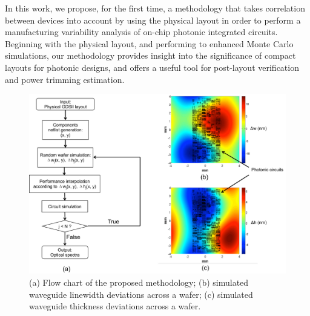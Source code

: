 \documentclass[journal]{spie}
\begin{document}
In this work, we propose, for the first time, a methodology that takes correlation between devices into account by using the physical layout in order to perform a manufacturing variability analysis of on-chip photonic integrated circuits. Beginning with the physical layout, and performing to enhanced Monte Carlo simulations, our methodology  provides insight into the significance of compact layouts for photonic designs, and offers a useful tool for post-layout verification and power trimming estimation.

\begin{figure}[h]
    \centering
    \label{flow_chart}\includegraphics[width=\linewidth]{flow_chart.pdf}
    \caption{(a) Flow chart of the proposed methodology; (b) simulated waveguide linewidth deviations across a wafer; (c) simulated waveguide thickness deviations across a wafer.}
    \label{flow_chart}  
\end{figure}
\end{document}

